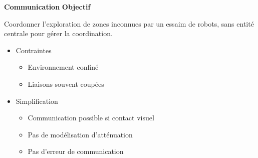 \documentclass[aspectratio=169,10pt]{beamer}
\begin{document}
\begin{frame}{\textbf{Communication}}
	\textbf{Objectif}

	\vspace{0.5em}
	
	Coordonner l'exploration de zones inconnues par un essaim de robots, sans entité centrale pour gérer la coordination.
	
	\vspace{0.5em}

	\begin{itemize}
		\item Contraintes
		\begin{itemize}
			\item Environnement confiné
			\vspace{0.2cm}
			\item Liaisons souvent coupées
		\end{itemize}
		\vspace{0.2cm}
		\item Simplification
		\begin{itemize}
			\item Communication possible si contact visuel
			\vspace{0.2cm}
			\item Pas de modélisation d'atténuation
			\vspace{0.2cm}
			\item Pas d'erreur de communication
		\end{itemize}
	\end{itemize}

\end{frame}
\end{document}
